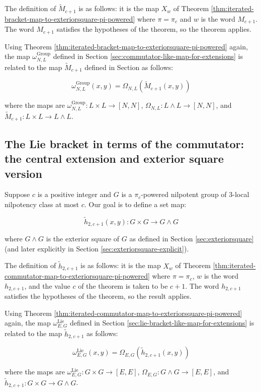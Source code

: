 The definition of $\tilde{M}_{c+1}$ is as follows: it is the map $X_w$
of Theorem \ref{thm:iterated-bracket-map-to-exteriorsquare-pi-powered}
where $\pi = \pi_c$ and $w$ is the word $M_{c+1}$. The word $M_{c+1}$
satisfies the hypotheses of the theorem, so the theorem applies.

Using Theorem
\ref{thm:iterated-bracket-map-to-exteriorsquare-pi-powered} again, the
map $\omega_{N,L}^{\text{Group}}$ defined in Section
\ref{sec:commutator-like-map-for-extensions} is related to the map
$\tilde{M}_{c+1}$ defined in Section as follows:

$$\omega_{N,L}^{\text{Group}}(x,y) = \Omega_{N,L}(\tilde{M}_{c+1}(x,y))$$

where the maps are $\omega_{N,L}^{\text{Group}}: L \times L \to [N,N]$,
$\Omega_{N,L}: L \wedge L \to [N,N]$, and $\tilde{M}_{c+1}:L \times L
\to L \wedge L$.

\subsection{The Lie bracket in terms of the commutator: the central extension and exterior square version}\label{sec:lie-bracket-ito-group-commutator-exteriorsquare-version}

Suppose $c$ is a positive integer and $G$ is a $\pi_c$-powered nilpotent group
of $3$-local nilpotency class at most $c$. Our goal is to define a set
map:

$$\tilde{h}_{2,c+1}(x,y): G \times G \to G \wedge G$$

where $G \wedge G$ is the exterior square of $G$ as defined in Section
\ref{sec:exteriorsquare} (and later explicitly in Section
\ref{sec:exteriorsquare-explicit}). 

The definition of $\tilde{h}_{2,c+1}$ is as follows: it is the map
$X_w$ of Theorem
\ref{thm:iterated-commutator-map-to-exteriorsquare-pi-powered} where
$\pi = \pi_c$, $w$ is the word $h_{2,c+1}$, and the value $c$ of the
theorem is taken to be $c + 1$. The word $h_{2,c+1}$ satisfies the
hypotheses of the theorem, so the result applies.

Using Theorem
\ref{thm:iterated-commutator-map-to-exteriorsquare-pi-powered} again,
the map $\omega_{E,G}^{\text{Lie}}$ defined in Section
\ref{sec:lie-bracket-like-map-for-extensions} is related to the map
$\tilde{h}_{2,c+1}$ as follows:

$$\omega_{E,G}^{\text{Lie}}(x,y) = \Omega_{E,G}(\tilde{h}_{2,c+1}(x,y))$$

where the maps are $\omega_{E,G}^{\text{Lie}}: G \times G \to [E,E]$,
$\Omega_{E,G}: G \wedge G \to [E,E]$, and $\tilde{h}_{2,c+1}:G \times G
\to G \wedge G$.

